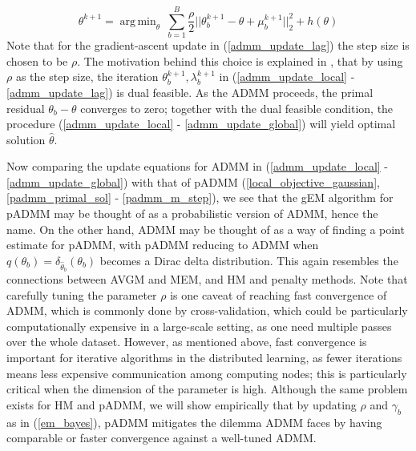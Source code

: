 \documentclass{article}
\DeclareMathOperator*{\argmin}{arg\,min}
\newcommand{\1}[0]{\ensuremath{\boldsymbol{1}}\xspace}
\begin{document}
\begin{equation}\label{admm_update_global}
\theta^{k+1} = \argmin_\theta ~\textstyle\sum_{b=1}^B\frac{\rho}{2}||\theta_b^{k+1} - \theta + \mu_b^{k+1}||^2_2 + h(\theta)
\end{equation}
Note that for the gradient-ascent update in (\ref{admm_update_lag}) the step size is chosen to be $\rho$. The motivation behind this choice is explained in , that by using $\rho$ as the step size, the iteration
$\theta_b^{k+1}, \lambda_b^{k+1}$ in (\ref{admm_update_local} - \ref{admm_update_lag}) is dual feasible. As the ADMM proceeds, the primal residual $\theta_b -\theta$ converges to zero; together with the dual feasible condition, the procedure (\ref{admm_update_local} - \ref{admm_update_global}) will yield optimal solution $\hat\theta$. 

Now comparing the update equations for ADMM in (\ref{admm_update_local} - \ref{admm_update_global}) with that of pADMM (\ref{local_objective_gaussian}, \ref{padmm_primal_sol} - \ref{padmm_m_step}), we see that the gEM algorithm for pADMM may be thought of as a probabilistic version of ADMM, hence the name. On the other hand, ADMM may be thought of as a way of finding a point estimate for pADMM, with pADMM reducing to ADMM when $q(\theta_b) = \delta_{\hat\theta_b}(\theta_b)$ becomes a Dirac delta distribution. This again resembles the connections between AVGM and MEM, and HM and penalty methods. Note that carefully tuning the parameter $\rho$ is one caveat of reaching fast convergence of ADMM, which is commonly done by cross-validation, which could be particularly computationally expensive in a large-scale setting, as one need multiple passes over the whole dataset. However, as mentioned above, fast convergence is important for iterative algorithms in the distributed learning, as fewer iterations means less expensive communication among computing nodes; this is particularly critical when the dimension of the parameter is high. Although the same problem exists for HM and pADMM, we will show empirically that by updating $\rho$ and $\gamma_b$ as in (\ref{em_bayes}), pADMM mitigates the dilemma ADMM faces by having comparable or faster convergence against a well-tuned ADMM.
 
\end{document}
